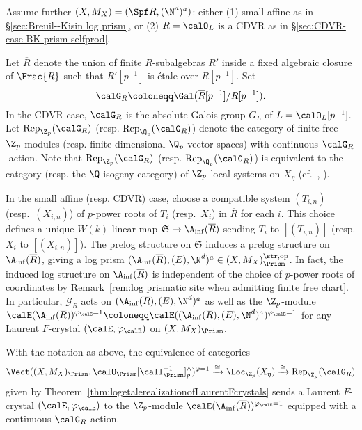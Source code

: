 \begin{notation}\label{notation: Ainf and GR}
Assume further $(X,M_X)=(\Spf R, (\N^d)^a)$: either (1) small affine as in \S\ref{sec:Breuil--Kisin log prism}, or (2) $R=\calO_L$ is a CDVR as in \S\ref{sec:CDVR-case-BK-prism-selfprod}. 

Let $\overline{R}$ denote the union of finite $R$-subalgebras $R'$ inside a fixed algebraic closure of $\Frac{R}$ such that $R'[p^{-1}]$ is \'etale over $R[p^{-1}]$. Set 
\[
\calG_{R}\coloneqq \Gal(\overline{R}[p^{-1}]/R[p^{-1}]).
\]
In the CDVR case, $\calG_{R}$ is the absolute Galois group $G_L$ of $L = \calO_L[p^{-1}]$. Let $\mathrm{Rep}_{\Z_p}(\calG_R)$ (resp. $\mathrm{Rep}_{\Q_p}(\calG_R)$) denote the category of finite free $\Z_p$-modules (resp. finite-dimensional $\Q_p$-vector spaces) with continuous $\calG_R$-action. Note that $\mathrm{Rep}_{\Z_p}(\calG_R)$ (resp. $\mathrm{Rep}_{\Q_p}(\calG_R)$) is equivalent to the category (resp. the $\Q$-isogeny category) of $\Z_p$-local systems on $X_\eta$ (cf.~\cite[\S1.4, 8.2, 8.4]{kedlaya-liu-relative-padichodge}, \cite[\S15]{scholze-etalecohomologyofdiamonds}).    

In the small affine (resp. CDVR) case, choose a compatible system $(T_{i,n})$ (resp.~$(X_{i,n})$) of $p$-power roots of $T_i$ (resp.~$X_i$) in $\overline{R}$ for each $i$. This choice defines a unique $W(k)$-linear map $\mathfrak{S} \to \A_\mathrm{inf}(\overline{R})$ sending $T_i$ to $[(T_{i,n})]$ (resp. $X_i$ to $[(X_{i,n})]$). The prelog structure on $\mathfrak{S}$ induces a prelog structure on $\A_\mathrm{inf}(\overline{R})$, giving a log prism $(\A_\mathrm{inf}(\overline{R}), (E), \N^d)^a \in (X,M_X)_\Prism^{\str, \mathrm{op}}$. In fact, the induced log structure on $\A_\mathrm{inf}(\overline{R})$ is independent of the choice of $p$-power roots of coordinates by Remark~\ref{rem:log prismatic site when admitting finite free chart}. In particular, $\mathcal{G}_R$ acts on $(\A_\mathrm{inf}(\overline{R}), (E), \N^d)^a$ as well as the $\Z_p$-module $\calE(\A_\mathrm{inf}(\overline{R}))^{\varphi_\calE=1}\coloneqq\calE((\A_\mathrm{inf}(\overline{R}), (E), \N^d)^a)^{\varphi_\calE=1}$ for any Laurent $F$-crystal $(\calE,\varphi_{\calE})$ on $(X,M_X)_\Prism$. 
\end{notation}

\begin{prop} \label{prop: explicit description of etale realization for Laurent F-crystal}
With the notation as above, the equivalence of categories
\[
\Vect((X,M_X)_\Prism,\calO_\Prism[\calI_\Prism^{-1}]^\wedge_p)^{\varphi=1}\xrightarrow{\cong} \Loc_{\Z_p}(X_\eta)\xrightarrow{\cong} \mathrm{Rep}_{\Z_p}(\calG_R)
\]
given by Theorem~\ref{thm:logetalerealizationofLaurentFcrystals} sends a Laurent $F$-crystal $(\calE,\varphi_\calE)$ to the $\Z_p$-module $\calE(\A_\mathrm{inf}(\overline{R}))^{\varphi_\calE=1}$ equipped with a continuous $\calG_R$-action.  
\end{prop}

